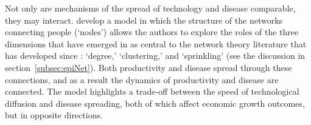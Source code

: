 
Not only are mechanisms of the spread of technology and disease comparable, they may interact.  \href{https://github.com/iworld1991/EpiExp/blob/master/Literature/fogli2012germs.pdf}{\cite{fogli2021germs}} develop a model in which the structure of the networks connecting people (`nodes') allows the authors to explore the roles of the three dimensions that have emerged in as central to the network theory literature that has developed since \cite{erdos1960evolution}: `degree,' `clustering,' and `sprinkling' (see the discussion in section~\ref{subsec:epiNet}).  Both productivity and disease spread through these connections, and as a result the dynamics of productivity and disease are connected.  The model highlights a trade-off between the speed of technological diffusion and disease spreading, both of which affect economic growth outcomes, but in opposite directions.


